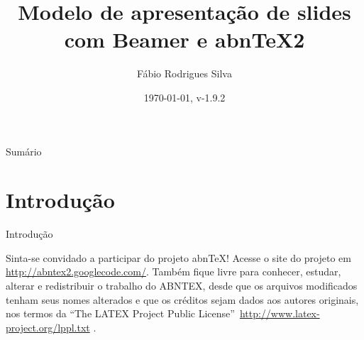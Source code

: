 \documentclass[aspectratio=169]{beamer}
\title{Modelo de apresentação de slides com Beamer e abnTeX2}
\author{Fábio Rodrigues Silva}
\institute{Universidade do Brasil
	    \par
	    Faculdade de Arquitetura da Informação}
\date{\today, v-1.9.2}
\begin{document}

\begin{frame}{Sumário}
\tableofcontents
\end{frame}

\section{Introdução}

\begin{frame}{Introdução}

Sinta-se convidado a participar do projeto abnTeX! Acesse o site do projeto em
\url{http://abntex2.googlecode.com/}. Também fique livre para conhecer,
estudar, alterar e redistribuir o trabalho do ABNTEX, desde que os arquivos
modificados tenham seus nomes alterados e que os créditos sejam dados aos
autores originais, nos termos da ``The LATEX Project Public
License''\ \url{http://www.latex-project.org/lppl.txt} \cite[p. 31]{abntex2modelo}.

\end{frame}

\end{document}
